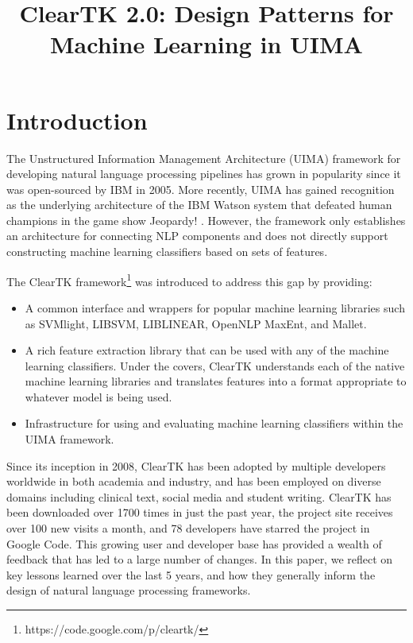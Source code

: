 \documentclass[10pt, a4paper]{article}
\title{ClearTK 2.0: Design Patterns for Machine Learning in UIMA}
\begin{document}
\maketitleabstract

\section{Introduction}
The Unstructured Information Management Architecture (UIMA) framework for developing natural language processing pipelines has grown in popularity since it was open-sourced by IBM in 2005.  More recently, UIMA has gained recognition as the underlying architecture of the IBM Watson system that defeated human champions in the game show Jeopardy! \cite{ferrucci_building_2010}.
However, the framework only establishes an architecture for connecting NLP components and does not directly support constructing machine learning classifiers based on sets of features.

The ClearTK framework\footnote{https://code.google.com/p/cleartk/} was introduced to address this gap \cite{ogren-etal:2008:UIMA-LREC,ogren-etal:2009:UIMA-GSCL} by providing:
\begin{itemize}
\item A common interface and wrappers for popular machine learning libraries such as SVMlight, LIBSVM, LIBLINEAR, OpenNLP MaxEnt, and Mallet.
\item A rich feature extraction library that can be used with any of the machine learning classifiers. Under the covers, ClearTK understands each of the native machine learning libraries and translates features into a format appropriate to whatever model is being used.
\item Infrastructure for using and evaluating machine learning classifiers within the UIMA framework.
\end{itemize}

Since its inception in 2008, ClearTK has been adopted by multiple developers worldwide in both academia and industry, and has been employed on diverse domains including clinical text, social media and student writing.
ClearTK has been downloaded over 1700 times in just the past year, the project site receives over 100 new visits a month, and 78 developers have starred the project in Google Code.  
This growing user and developer base has provided a wealth of feedback that has led to a large number of changes.
In this paper, we reflect on key lessons learned over the last 5 years, and how they generally inform the design of natural language processing frameworks.
\end{document}
